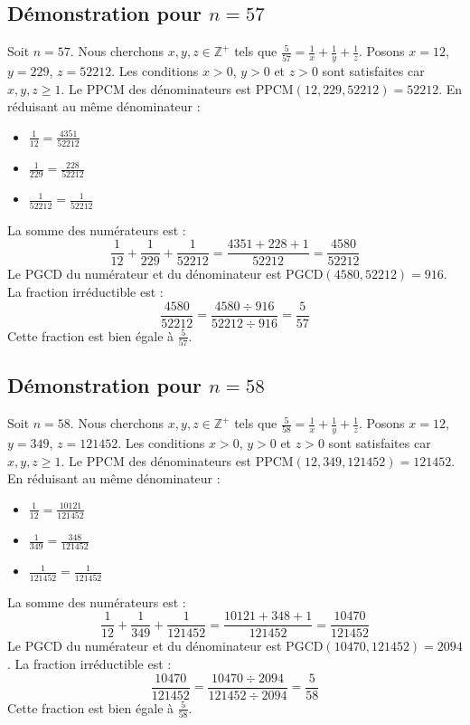 \documentclass[11pt,a4paper]{article}
\begin{document}
\subsection{Démonstration pour $n = 57$}
Soit $n = 57$. Nous cherchons $x, y, z \in \mathbb{Z}^{+}$ tels que $\frac{5}{57} = \frac{1}{x} + \frac{1}{y} + \frac{1}{z}$.
Posons $x = 12$, $y = 229$, $z = 52212$.
Les conditions $x > 0$, $y > 0$ et $z > 0$ sont satisfaites car $x, y, z \geq 1$.
Le PPCM des dénominateurs est $\text{PPCM}(12, 229, 52212) = 52212$.
En réduisant au même dénominateur :
\begin{itemize}
    \item $\frac{1}{12} = \frac{4351}{52212}$
    \item $\frac{1}{229} = \frac{228}{52212}$
    \item $\frac{1}{52212} = \frac{1}{52212}$
\end{itemize}
La somme des numérateurs est :
$$ \frac{1}{12} + \frac{1}{229} + \frac{1}{52212} = \frac{4351 + 228 + 1}{52212} = \frac{4580}{52212} $$
Le PGCD du numérateur et du dénominateur est $\text{PGCD}(4580, 52212) = 916$.
La fraction irréductible est :
$$ \frac{4580}{52212} = \frac{4580 \div 916}{52212 \div 916} = \frac{5}{57} $$
Cette fraction est bien égale à $\frac{5}{57}$.

\subsection{Démonstration pour $n = 58$}
Soit $n = 58$. Nous cherchons $x, y, z \in \mathbb{Z}^{+}$ tels que $\frac{5}{58} = \frac{1}{x} + \frac{1}{y} + \frac{1}{z}$.
Posons $x = 12$, $y = 349$, $z = 121452$.
Les conditions $x > 0$, $y > 0$ et $z > 0$ sont satisfaites car $x, y, z \geq 1$.
Le PPCM des dénominateurs est $\text{PPCM}(12, 349, 121452) = 121452$.
En réduisant au même dénominateur :
\begin{itemize}
    \item $\frac{1}{12} = \frac{10121}{121452}$
    \item $\frac{1}{349} = \frac{348}{121452}$
    \item $\frac{1}{121452} = \frac{1}{121452}$
\end{itemize}
La somme des numérateurs est :
$$ \frac{1}{12} + \frac{1}{349} + \frac{1}{121452} = \frac{10121 + 348 + 1}{121452} = \frac{10470}{121452} $$
Le PGCD du numérateur et du dénominateur est $\text{PGCD}(10470, 121452) = 2094$.
La fraction irréductible est :
$$ \frac{10470}{121452} = \frac{10470 \div 2094}{121452 \div 2094} = \frac{5}{58} $$
Cette fraction est bien égale à $\frac{5}{58}$.
\end{document}
